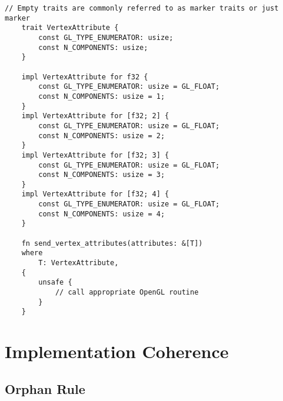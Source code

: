 \begin{lstlisting}[Language=Rust]
    // Empty traits are commonly referred to as marker traits or just marker
    trait VertexAttribute {
        const GL_TYPE_ENUMERATOR: usize;
        const N_COMPONENTS: usize;
    }

    impl VertexAttribute for f32 { 
        const GL_TYPE_ENUMERATOR: usize = GL_FLOAT;
        const N_COMPONENTS: usize = 1;
    }
    impl VertexAttribute for [f32; 2] { 
        const GL_TYPE_ENUMERATOR: usize = GL_FLOAT;
        const N_COMPONENTS: usize = 2;
    }
    impl VertexAttribute for [f32; 3] { 
        const GL_TYPE_ENUMERATOR: usize = GL_FLOAT;
        const N_COMPONENTS: usize = 3;
    }
    impl VertexAttribute for [f32; 4] { 
        const GL_TYPE_ENUMERATOR: usize = GL_FLOAT;
        const N_COMPONENTS: usize = 4;
    }

    fn send_vertex_attributes(attributes: &[T])
    where
        T: VertexAttribute,
    {
        unsafe {
            // call appropriate OpenGL routine
        }
    }
\end{lstlisting}

\section{Implementation Coherence}

\subsection{Orphan Rule}